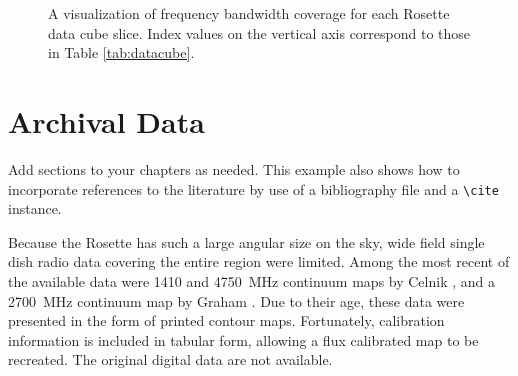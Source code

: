 \begin{figure}
\begin{center}
\caption[Rosette Band Coverage]{A visualization of frequency bandwidth coverage for each Rosette data cube slice. Index values on the vertical axis correspond to those in Table \ref{tab:datacube}. \label{fig:bands}}
\end{center}
\end{figure}


\section{Archival Data}

Add sections to your chapters as needed.  This example also shows how to incorporate references to the literature by use of a bibliography file and a \verb|\cite| instance.

Because the Rosette has such a large angular size on the sky, wide field single dish radio data covering
the entire region were limited. Among the most recent of the available data were 1410 and 4750~MHz
continuum maps by Celnik \cite{celnik1985}, and a 2700~MHz continuum map  
by Graham \cite{graham1982}. Due to their age, these data were presented in the form of printed contour maps. Fortunately, calibration information
is included in tabular form, allowing a flux calibrated map to be recreated.  The original digital data are not available.


